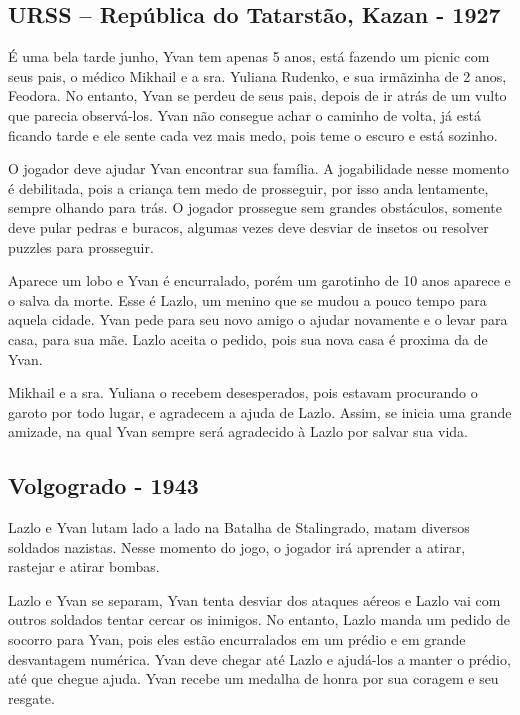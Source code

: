 \documentclass[12pt, a4paper]{article}
\begin{document}
    \subsection{URSS – República do Tatarstão, Kazan - 1927}

	É uma bela tarde junho, Yvan tem apenas 5 anos, está fazendo
    um picnic com seus pais, o médico Mikhail e a sra. Yuliana 
    Rudenko, e sua irmãzinha de 2 anos, Feodora. No entanto, Yvan se perdeu
    de seus pais, depois de ir atrás de um vulto que parecia
    observá-los. Yvan não 
    consegue achar o caminho de volta, já está ficando tarde e ele sente 
    cada vez mais medo, pois teme o escuro e está sozinho.
	
    O jogador deve ajudar Yvan encontrar sua família. A jogabilidade nesse 
    momento é debilitada, pois a criança tem medo de prosseguir, por isso 
    anda lentamente, sempre olhando para trás. O jogador prossegue sem 
    grandes obstáculos, somente deve pular pedras e buracos, algumas 
    vezes deve desviar de insetos ou resolver puzzles para prosseguir. 
	
    Aparece um lobo e Yvan é encurralado, porém
    um garotinho de 10 anos aparece e o salva da morte. Esse é Lazlo,
    um menino que se mudou a pouco tempo para aquela cidade.
	Yvan pede para seu novo amigo o ajudar novamente e o levar para casa, 
    para sua mãe. Lazlo aceita o pedido, pois sua nova casa é proxima 
    da de Yvan.
	
    Mikhail e a sra. Yuliana o recebem desesperados, pois estavam 
    procurando o garoto por todo lugar, e agradecem a ajuda de Lazlo.
    Assim, se inicia uma grande amizade, na qual Yvan
    sempre será agradecido à Lazlo por salvar sua vida.

	\subsection{Volgogrado - 1943}

	Lazlo e Yvan lutam lado a lado na Batalha de Stalingrado, matam 
    diversos soldados nazistas. Nesse momento do jogo, o jogador irá 
    aprender a atirar, rastejar e  atirar bombas.
    
    Lazlo e Yvan se separam, Yvan tenta desviar dos ataques aéreos 
    e Lazlo vai com outros soldados tentar cercar os inimigos. No entanto,
    Lazlo manda um pedido de socorro para Yvan, pois eles estão 
    encurralados em um prédio e em grande desvantagem numérica.
    Yvan deve chegar até Lazlo e ajudá-los a manter o prédio,
    até que chegue ajuda.
    Yvan recebe um medalha de honra por sua coragem e seu resgate.
\end{document}
